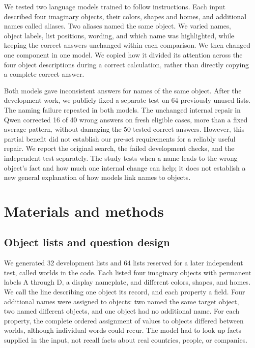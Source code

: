 \documentclass[10pt,letterpaper]{article}
\begin{document}
We tested two language models trained to follow instructions. Each input described four imaginary objects, their colors, shapes and homes, and additional names called aliases. Two aliases named the same object. We varied names, object labels, list positions, wording, and which name was highlighted, while keeping the correct answers unchanged within each comparison. We then changed one component in one model. We copied how it divided its attention across the four object descriptions during a correct calculation, rather than directly copying a complete correct answer.


Both models gave inconsistent answers for names of the same object. After the development work, we publicly fixed a separate test on 64 previously unused lists. The naming failure repeated in both models. The unchanged internal repair in Qwen corrected 16 of 40 wrong answers on fresh eligible cases, more than a fixed average pattern, without damaging the 50 tested correct answers. However, this partial benefit did not establish our pre-set requirements for a reliably useful repair. We report the original search, the failed development checks, and the independent test separately. The study tests when a name leads to the wrong object's fact and how much one internal change can help; it does not establish a new general explanation of how models link names to objects.


\section*{Materials and methods}

\subsection*{Object lists and question design}

We generated 32 development lists and 64 lists reserved for a later independent test, called worlds in the code. Each listed four imaginary objects with permanent labels A through D, a display nameplate, and different colors, shapes, and homes. We call the line describing one object its record, and each property a field. Four additional names were assigned to objects: two named the same target object, two named different objects, and one object had no additional name. For each property, the complete ordered assignment of values to objects differed between worlds, although individual words could recur. The model had to look up facts supplied in the input, not recall facts about real countries, people, or companies.
\end{document}
